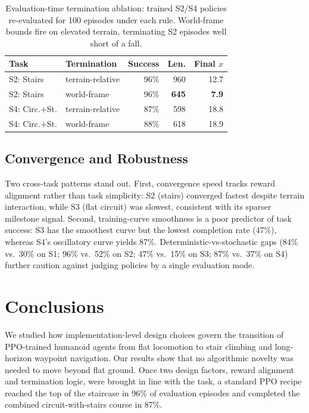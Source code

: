 \documentclass[conference,a4paper]{IEEEtran}
\begin{document}
\begin{table}[t]
\centering
\caption{Evaluation-time termination ablation: trained S2/S4 policies re-evaluated for 100 episodes under each rule. World-frame bounds fire on elevated terrain, terminating S2 episodes well short of a fall.}
\label{tab:term_ablation}
\footnotesize
\setlength{\tabcolsep}{4pt}
\begin{tabular}{@{}llrrr@{}}
\toprule
\textbf{Task} & \textbf{Termination} & \textbf{Success} & \textbf{Len.} & \textbf{Final} $x$ \\
\midrule
S2: Stairs & terrain-relative & 96\% & 960 & 12.7 \\
S2: Stairs & world-frame & 96\% & \textbf{645} & \textbf{7.9} \\
S4: Circ.+St. & terrain-relative & 87\% & 598 & 18.8 \\
S4: Circ.+St. & world-frame & 88\% & 618 & 18.9 \\
\bottomrule
\end{tabular}
\end{table}

\subsection{Convergence and Robustness}
Two cross-task patterns stand out. First, convergence speed tracks reward alignment rather than task simplicity: S2 (stairs) converged fastest despite terrain interaction, while S3 (flat circuit) was slowest, consistent with its sparser milestone signal. Second, training-curve smoothness is a poor predictor of task success: S3 has the smoothest curve but the lowest completion rate (47\%), whereas S4's oscillatory curve yields 87\%. Deterministic-vs-stochastic gaps (84\% vs.\ 30\% on S1; 96\% vs.\ 52\% on S2; 47\% vs.\ 15\% on S3; 87\% vs.\ 37\% on S4) further caution against judging policies by a single evaluation mode.

\section{Conclusions}
\label{sec:conclusion}

We studied how implementation-level design choices govern the transition of PPO-trained humanoid agents from flat locomotion to stair climbing and long-horizon waypoint navigation. Our results show that no algorithmic novelty was needed to move beyond flat ground. Once two design factors, reward alignment and termination logic, were brought in line with the task, a standard PPO recipe reached the top of the staircase in 96\% of evaluation episodes and completed the combined circuit-with-stairs course in 87\%.
\end{document}
